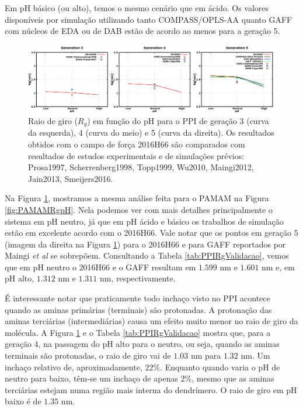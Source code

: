 Em pH básico (ou alto), temos o mesmo cenário que em ácido.
Os valores disponíveis por simulação utilizando tanto COMPASS/OPLS-AA\cite{Wu2010} quanto GAFF com núcleos de EDA\cite{Jain2013} ou de DAB\cite{Maingi2012} estão de acordo ao menos para a geração 5.

\begin{figure}[ht!]
\centering
\includegraphics[width=\textwidth]{images/PPIgyrateGpH.png}
\caption{Raio de giro ($R_g$) em função do pH para o PPI de geração 3 (curva da esquerda), 4 (curva do meio) e 5 (curva da direita).
Os resultados obtidos com o campo de força 2016H66\cite{Horta2016} são comparados com resultados de estudos experimentais e de simulações prévios:
Prosa1997\cite{Prosa1997}, %
Scherrenberg1998\cite{Scherrenberg1998}, %
Topp1999\cite{Topp1999}, %
Wu2010\cite{Wu2010}, %
Maingi2012\cite{Maingi2012}, %
Jain2013\cite{Jain2013}, %
Smeijers2016\cite{Smeijers2016}.} %
\label{fig:PPIRgpH}
\end{figure}

Na Figura \ref{fig:PPIRgpH}, mostramos a mesma análise feita para o PAMAM na Figura \ref{fig:PAMAMRgpH}.
Nela podemos ver com mais detalhes principalmente o sistema em pH neutro, já que em pH ácido e básico os trabalhos de simulação estão em excelente acordo com o 2016H66\cite{Horta2016}.
Vale notar que os pontos em geração 5 (imagem da direita na Figura \ref{fig:PPIRgpH}) para o 2016H66\cite{Horta2016} e para GAFF\cite{Mayo1990} reportados por Maingi \textit{et al}\cite{Maingi2012} se sobrepõem.
Consultando a Tabela \ref{tab:PPIRgValidacao}, vemos que em pH neutro o 2016H66\cite{Horta2016} e o GAFF\cite{Maingi2012} resultam em $1.599$ nm e $1.601$ nm e, em pH alto, $1.312$ nm e $1.311$ nm, respectivamente.

É interessante notar que praticamente todo inchaço visto no PPI acontece quando as aminas primárias (terminais) são protonadas.
A protonação das aminas terciárias (intermediárias) causa um efeito muito menor no raio de giro da molécula.
A Figura \ref{fig:PPIRgpH} e o Tabela \ref{tab:PPIRgValidacao} mostra que, para a geração 4, na passagem do pH alto para o neutro, ou seja, quando as aminas terminais são protonadas, o raio de giro vai de $1.03$ nm para $1.32$ nm.
Um inchaço relativo de, aproximadamente, $22\%$.
Enquanto quando varia o pH de neutro para baixo, têm-se um inchaço de apenas 2\%, mesmo que as aminas terciárias estejam numa região mais interna do dendrímero. O raio de giro em pH baixo é de $1.35$ nm.



